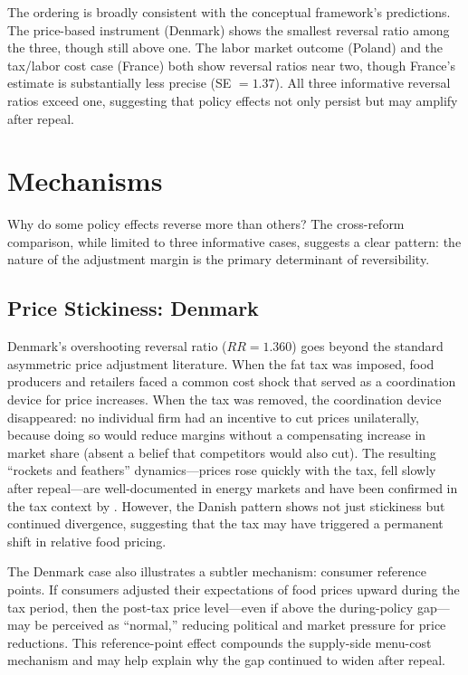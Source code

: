 \documentclass[12pt]{article}
\begin{document}
The ordering is broadly consistent with the conceptual framework's predictions. The price-based instrument (Denmark) shows the smallest reversal ratio among the three, though still above one. The labor market outcome (Poland) and the tax/labor cost case (France) both show reversal ratios near two, though France's estimate is substantially less precise (SE $= 1.37$). All three informative reversal ratios exceed one, suggesting that policy effects not only persist but may amplify after repeal.


\section{Mechanisms}
\label{sec:mechanisms}

Why do some policy effects reverse more than others? The cross-reform comparison, while limited to three informative cases, suggests a clear pattern: the nature of the adjustment margin is the primary determinant of reversibility.

\subsection{Price Stickiness: Denmark}

Denmark's overshooting reversal ratio ($RR = 1.360$) goes beyond the standard asymmetric price adjustment literature. When the fat tax was imposed, food producers and retailers faced a common cost shock that served as a coordination device for price increases. When the tax was removed, the coordination device disappeared: no individual firm had an incentive to cut prices unilaterally, because doing so would reduce margins without a compensating increase in market share (absent a belief that competitors would also cut). The resulting ``rockets and feathers'' dynamics---prices rose quickly with the tax, fell slowly after repeal---are well-documented in energy markets \citep{peltzman2000prices} and have been confirmed in the tax context by \citet{benzarti2020really}. However, the Danish pattern shows not just stickiness but continued divergence, suggesting that the tax may have triggered a permanent shift in relative food pricing.

The Denmark case also illustrates a subtler mechanism: consumer reference points. If consumers adjusted their expectations of food prices upward during the tax period, then the post-tax price level---even if above the during-policy gap---may be perceived as ``normal,'' reducing political and market pressure for price reductions. This reference-point effect compounds the supply-side menu-cost mechanism and may help explain why the gap continued to widen after repeal.
\end{document}
